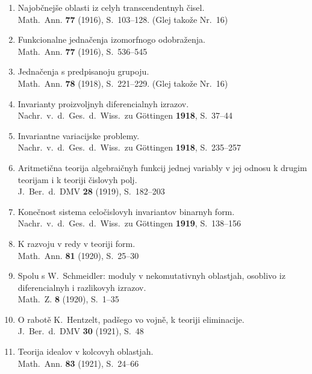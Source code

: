 \documentclass[11pt]{article}
\newcommand{\foreign}[1]{#1}
\begin{document}
\begin{enumerate}[label={\small\arabic*.},leftmargin=2em,itemsep=0.3em]
\item Najobčnejše oblasti iz celyh transcendentnyh čisel.\\
\foreign{Math.\ Ann.} \textbf{77} (1916), S.~103--128. (Glej takože Nr.~16)

\item Funkcionalne jednačenja izomorfnogo odobraženja.\\
\foreign{Math.\ Ann.} \textbf{77} (1916), S.~536--545

\item Jednačenja s predpisanoju grupoju.\\
\foreign{Math.\ Ann.} \textbf{78} (1918), S.~221--229. (Glej takože Nr.~16)

\item Invarianty proizvoljnyh diferencialnyh izrazov.\\
\foreign{Nachr.\ v.\ d.\ Ges.\ d.\ Wiss.\ zu Göttingen} \textbf{1918}, S.~37--44

\item Invariantne variacijske problemy.\\
\foreign{Nachr.\ v.\ d.\ Ges.\ d.\ Wiss.\ zu Göttingen} \textbf{1918}, S.~235--257

\item Aritmetična teorija algebraičnyh funkcij jednej variably v jej odnosu k drugim teorijam i k teoriji čislovyh polj.\\
\foreign{J.\ Ber.\ d.\ DMV} \textbf{28} (1919), S.~182--203

\item Konečnost sistema celočislovyh invariantov binarnyh form.\\
\foreign{Nachr.\ v.\ d.\ Ges.\ d.\ Wiss.\ zu Göttingen} \textbf{1919}, S.~138--156

\item K razvoju v redy v teoriji form.\\
\foreign{Math.\ Ann.} \textbf{81} (1920), S.~25--30

\item Spolu s W.\ Schmeidler: moduly v nekomutativnyh oblastjah, osoblivo iz diferencialnyh i razlikovyh izrazov.\\
\foreign{Math.\ Z.} \textbf{8} (1920), S.~1--35

\item O rabotě K.\ Hentzelt, padšego vo vojně, k teoriji eliminacije.\\
\foreign{J.\ Ber.\ d.\ DMV} \textbf{30} (1921), S.~48

\item Teorija idealov v kolcovyh oblastjah.\\
\foreign{Math.\ Ann.} \textbf{83} (1921), S.~24--66


\end{enumerate}
\end{document}
